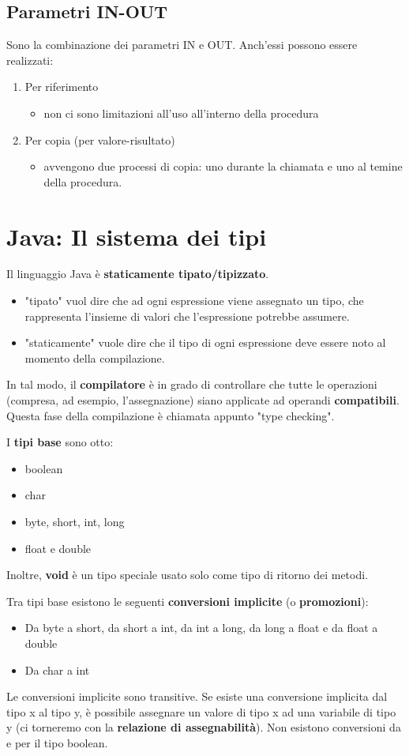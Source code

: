 \documentclass[10pt]{article}
\begin{document}
\subsection{Parametri IN-OUT}
Sono la combinazione dei parametri IN e OUT. Anch'essi possono essere realizzati:
\begin{enumerate}
    \item Per riferimento
    \begin{itemize}
        \item non ci sono limitazioni all'uso all'interno della procedura
    \end{itemize}
    \item Per copia (per valore-risultato)
    \begin{itemize}
        \item avvengono due processi di copia: uno durante la chiamata e uno al temine della procedura.
    \end{itemize}
\end{enumerate}
\section{Java: Il sistema dei tipi}
Il linguaggio Java è \textbf{staticamente tipato/tipizzato}.
\begin{itemize}
    \item "tipato" vuol dire che ad ogni espressione viene assegnato un tipo, che rappresenta l'insieme di valori che l'espressione potrebbe assumere.
    \item "staticamente" vuole dire che il tipo di ogni espressione deve essere noto al momento della compilazione.
\end{itemize}
In tal modo, il \textbf{compilatore} è in grado di controllare che tutte le operazioni (compresa, ad esempio, l'assegnazione) siano applicate ad operandi \textbf{compatibili}.
Questa fase della compilazione è chiamata appunto "type checking".

I \textbf{tipi base} sono otto:
\begin{itemize}
    \item boolean
    \item char
    \item byte, short, int, long
    \item float e double
\end{itemize}
Inoltre, \textbf{void} è un tipo speciale usato solo come tipo di ritorno dei metodi.

Tra tipi base esistono le seguenti \textbf{conversioni implicite} (o \textbf{promozioni}):
\begin{itemize}
    \item Da byte a short, da short a int, da int a long, da long a float e da float a double
    \item Da char a int
\end{itemize}
Le conversioni implicite sono transitive. Se esiste una conversione implicita dal tipo x al tipo y, è possibile assegnare un valore di tipo x ad una variabile di tipo y (ci torneremo con la \textbf{relazione di assegnabilità}). Non esistono conversioni da e per il tipo boolean.
\end{document}
